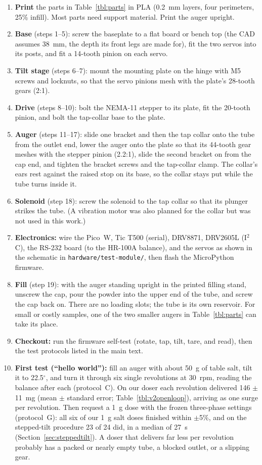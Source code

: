 \documentclass[10pt]{article}
\begin{document}
\begin{enumerate}
\item \textbf{Print} the parts in Table~\ref{tbl:parts} in PLA (0.2~mm layers,
four perimeters, 25\% infill). Most parts need support material. Print the
auger upright.
\item \textbf{Base} (steps 1--5): screw the baseplate to a flat board or bench
top (the CAD assumes 38~mm, the depth its front legs are made for), fit the two
servos into its posts, and fit a 14-tooth pinion on each servo.
\item \textbf{Tilt stage} (steps 6--7): mount the mounting plate on the hinge
with M5 screws and locknuts, so that the servo pinions mesh with the plate's
28-tooth gears (2:1).
\item \textbf{Drive} (steps 8--10): bolt the NEMA-11 stepper to its plate, fit
the 20-tooth pinion, and bolt the tap-collar base to the plate.
\item \textbf{Auger} (steps 11--17): slide one bracket and then the tap collar
onto the tube from the outlet end, lower the auger onto the plate so that its
44-tooth gear meshes with the stepper pinion (2.2:1), slide the second bracket
on from the cap end, and tighten the bracket screws and the tap-collar clamp.
The collar's ears rest against the raised stop on its base, so the collar
stays put while the tube turns inside it.
\item \textbf{Solenoid} (step 18): screw the solenoid to the tap collar so that
its plunger strikes the tube. (A vibration motor was also planned for the
collar but was not used in this work.)
\item \textbf{Electronics:} wire the Pico~W, Tic T500 (serial), DRV8871,
DRV2605L (I$^2$C), the RS-232 board (to the HR-100A balance), and the servos as
shown in the schematic in \texttt{hardware/test-module/}, then flash the
MicroPython firmware.
\item \textbf{Fill} (step 19): with the auger standing upright in the printed
filling stand, unscrew the cap, pour the powder into the upper end of the tube,
and screw the cap back on. There are no loading slots; the tube is its own
reservoir. For small or costly samples, one of the two smaller augers in
Table~\ref{tbl:parts} can take its place.
\item \textbf{Checkout:} run the firmware self-test (rotate, tap, tilt,
tare, and read), then the test protocols listed in the main text.
\item \textbf{First test (``hello world''):} fill an auger with about 50~g of
table salt, tilt it to 22.5$^\circ$, and turn it through six single revolutions at
30~rpm, reading the balance after each (protocol~C). On our doser each revolution
delivered 146 $\pm$ 11~mg (mean $\pm$ standard error; Table~\ref{tbl:v2openloop}),
arriving as one surge per revolution. Then request a 1~g dose with the frozen
three-phase settings (protocol~G): all six of our 1~g salt doses finished within
$\pm$5\%, and on the stepped-tilt procedure 23 of 24 did, in a median of 27~s
(Section~\ref{sec:steppedtilt}). A doser that delivers far less per revolution
probably has a packed or nearly empty tube, a blocked outlet, or a slipping gear.
\end{enumerate}
\end{document}
